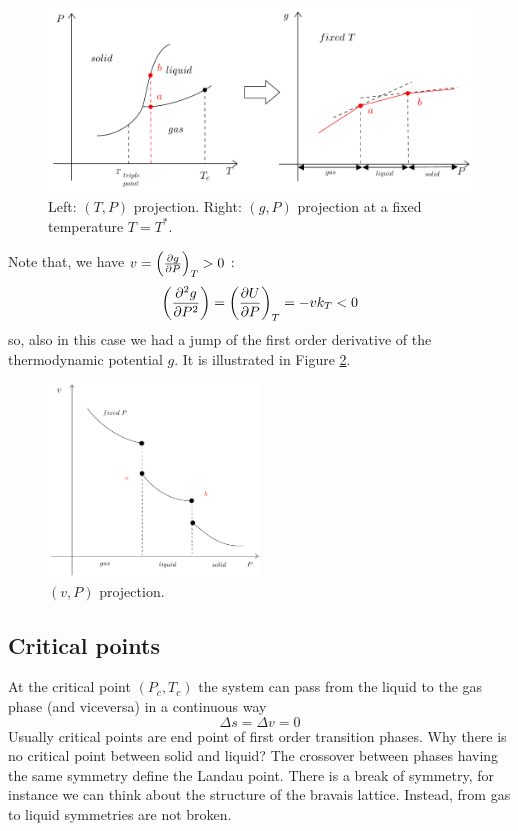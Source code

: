 \documentclass[../main/main.tex]{subfiles}
\begin{document}
\begin{figure}[h!]
\centering
\includegraphics[width=1\textwidth]{../lessons/2_image/5.pdf}
\caption{\label{fig:2_5} Left: \( (T,P) \) projection. Right:  \( (g,P) \) projection at a fixed temperature \( T = T^* \).}
\end{figure}

\noindent
Note that, we have  \( v= \qty(\pdv{g}{P} )_T > 0  \) :
\begin{equation}
  \qty(\pdv[2]{g}{P} ) = \qty(\pdv{U}{P} )_T = -v k_T < 0
  \label{eq:}
\end{equation}
so, also in this case we had a jump of the first order derivative of the thermodynamic potential \( g \).
It is illustrated in Figure \ref{fig:2_6}.


\begin{figure}[h!]
\centering
\includegraphics[width=0.5\textwidth]{../lessons/2_image/6.pdf}
\caption{\label{fig:2_6} \( (v,P) \) projection.}
\end{figure}

\clearpage
\subsection{Critical points}
At the critical point \( (P_c,T_c) \) the system can pass from the liquid to the gas phase (and viceversa) in a continuous way
\begin{equation*}
  \Delta s = \Delta v = 0
\end{equation*}
Usually critical points are end point of first order transition phases. Why there is no critical point between solid and liquid? The crossover between phases having the same symmetry define the Landau point. There is a break of symmetry, for instance we can think about the structure of the bravais lattice. Instead, from gas to liquid symmetries are not broken.
\end{document}
